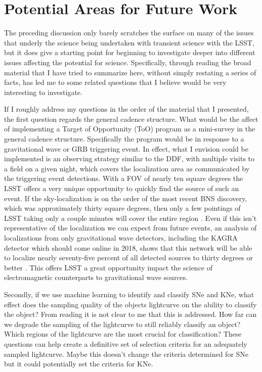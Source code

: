 \documentclass[12pt]{article}
\begin{document}
\section{Potential Areas for Future Work} %
The preceding discussion only barely scratches the surface on many of the issues that underly the science being undertaken with transient science with the LSST, but it does give a starting point for beginning to investigate deeper into different issues affecting the potential for science. Specifically, through reading the broad material that I have tried to summarize here, without simply restating a series of facts, has led me to some related questions that I believe would be very interesting to investigate. \par
If I roughly address my questions in the order of the material that I presented, the first question regards the general cadence structure. What would be the affect of implementing a Target of Opportunity (ToO) program as a mini-survey in the general cadence structure. Specifically the program would be in response to a gravitational wave or GRB triggering event. In effect, what I envision could be implemented is an observing strategy similar to the DDF, with multiple visits to a field on a given night, which covers the localization area as communicated by the triggering event detections. With a FOV of nearly ten square degrees the LSST offers a very unique opportunity to quickly find the source of such an event. If the sky-localization is on the order of the most recent BNS discovery, which was approximately thirty square degrees, then only a few pointings of LSST taking only a couple minutes will cover the entire region \citep{Kasliwal2017}. Even if this isn't representative of the localization we can expect from future events, an analysis of localizations from only gravitational wave detectors, including the KAGRA detector which should come online in 2018, shows that this network will be able to localize nearly seventy-five percent of all detected sources to thirty degrees or better \citep{Fairhurst2014}. This offers LSST a great opportunity impact the science of electromagnetic counterparts to gravitational wave sources.\par
Secondly, if we use machine learning to identify and classify SNe and KNe, what effect does the sampling quality of the objects lightcurve on the ability to classify the object? From reading \cite{Lochner2016} it is not clear to me that this is addressed. How far can we degrade the sampling of the lightcurve to still reliably classify an object? Which regions of the lightcurve are the most crucial for classification? These questions can help create a definitive set of selection criteria for an adequately sampled lightcurve. Maybe this doesn't change the criteria determined for SNe but it could potentially set the criteria for KNe.\par
\end{document}
